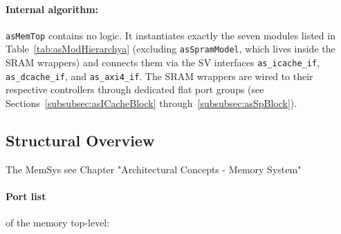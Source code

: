 \paragraph{Internal algorithm:}
\texttt{asMemTop} contains no logic.
It instantiates exactly the seven modules listed in
Table~\ref{tab:asModHierarchya} (excluding \texttt{asSpramModel}, which
lives inside the SRAM wrappers) and connects them via the SV interfaces
\texttt{as\_icache\_if}, \texttt{as\_dcache\_if}, and \texttt{as\_axi4\_if}.
The SRAM wrappers are wired to their respective controllers through
dedicated flat port groups (see Sections~\ref{subsubsec:asICacheBlock}
through~\ref{subsubsec:asSpBlock}).

\subsection{Structural Overview}
The MemSys  see Chapter "Architectural Concepts - Memory System"

\paragraph{Port list} of the memory top-level:

